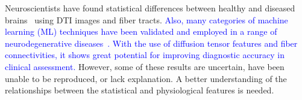 


%
%
Neuroscientists have found statistical differences 
between healthy and diseased brains~\cite{zhang2015diffusion,acosta2016whole, wen2016white} 
using DTI images and fiber tracts. \textcolor{blue}{ Also, many categories of machine learning (ML) techniques have been validated and employed in a range of neurodegenerative diseases~\cite{mateos2018structural,tanveer2020machine}. With the use of diffusion tensor features and fiber connectivities, it shows great potential for improving diagnostic accuracy in clinical assessment. }
However, some of these results are uncertain, have been unable to be reproduced, or lack explanation. A better understanding of the relationships between the statistical and physiological features is needed.

